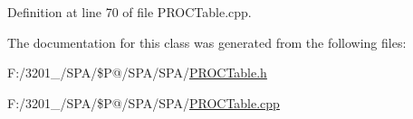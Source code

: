 Definition at line 70 of file P\-R\-O\-C\-Table.\-cpp.



The documentation for this class was generated from the following files\-:\begin{DoxyCompactItemize}
\item 
F\-:/3201\-\_/\-S\-P\-A/\$\-P@/\-S\-P\-A/\-S\-P\-A/\hyperlink{_p_r_o_c_table_8h}{P\-R\-O\-C\-Table.\-h}\item 
F\-:/3201\-\_/\-S\-P\-A/\$\-P@/\-S\-P\-A/\-S\-P\-A/\hyperlink{_p_r_o_c_table_8cpp}{P\-R\-O\-C\-Table.\-cpp}\end{DoxyCompactItemize}
